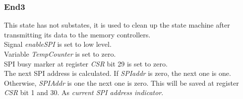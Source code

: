 \subsubsection{End3}
This state has not substates, it is used to clean up the state machine after transmitting its data to the memory controllers. \\
Signal \textit{enableSPI} is set to low level. \\
Variable \textit{TempCounter} is set to zero. \\
SPI busy marker at register \textit{CSR} bit 29 is set to zero.\\ 
The next SPI address is calculated. If \textit{SPIaddr} is zero, the next one is one. Otherwise, \textit{SPIAddr} is one the next one is zero. This will be saved at register \textit{CSR} bit 1 and 30. As \textit{current SPI address indicator}. 














